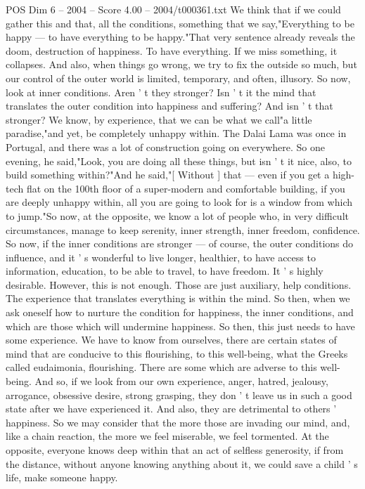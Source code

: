 \begin{textsample}{POS Dim 6 – 2004 – Score 4.00 – 2004/t000361.txt}
We think that if we could gather this and that, all the conditions, something that we say,"Everything to be happy — to have everything to be happy."That very sentence already reveals the doom, destruction of happiness.
To have everything.
If we miss something, it collapses.
And also, when things go wrong, we try to fix the outside so much, but our control of the outer world is limited, temporary, and often, illusory.
So now, look at inner conditions.
Aren ' t they stronger?
Isn ' t it the mind that translates the outer condition into happiness and suffering?
And isn ' t that stronger?
We know, by experience, that we can be what we call"a little paradise,"and yet, be completely unhappy within.
The Dalai Lama was once in Portugal, and there was a lot of construction going on everywhere.
So one evening, he said,"Look, you are doing all these things, but isn ' t it nice, also, to build something within?"And he said,"[ Without ] that — even if you get a high-tech flat on the 100th floor of a super-modern and comfortable building, if you are deeply unhappy within, all you are going to look for is a window from which to jump."So now, at the opposite, we know a lot of people who, in very difficult circumstances, manage to keep serenity, inner strength, inner freedom, confidence.
So now, if the inner conditions are stronger — of course, the outer conditions do influence, and it ' s wonderful to live longer, healthier, to have access to information, education, to be able to travel, to have freedom.
It ' s highly desirable.
However, this is not enough.
Those are just auxiliary, help conditions.
The experience that translates everything is within the mind.
So then, when we ask oneself how to nurture the condition for happiness, the inner conditions, and which are those which will undermine happiness.
So then, this just needs to have some experience.
We have to know from ourselves, there are certain states of mind that are conducive to this flourishing, to this well-being, what the Greeks called eudaimonia, flourishing.
There are some which are adverse to this well-being.
And so, if we look from our own experience, anger, hatred, jealousy, arrogance, obsessive desire, strong grasping, they don ' t leave us in such a good state after we have experienced it.
And also, they are detrimental to others ' happiness.
So we may consider that the more those are invading our mind, and, like a chain reaction, the more we feel miserable, we feel tormented.
At the opposite, everyone knows deep within that an act of selfless generosity, if from the distance, without anyone knowing anything about it, we could save a child ' s life, make someone happy.

\end{textsample}
